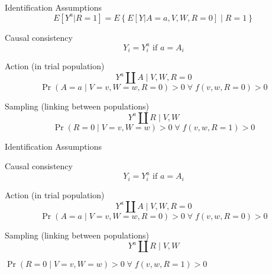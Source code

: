 \documentclass{beamer}
\begin{document}
\begin{frame}{Identification Assumptions}
	\[E[Y^a | R=1] = E\left\{E[Y|A=a,V,W,R=0] \mid R=1 \right\}\]
	\begin{block}{Causal consistency}
		\begin{equation*}
			Y_i = Y_i^a \text{ if } a=A_i
		\end{equation*}
	\end{block}
	\begin{block}{Action (in trial population)}
		\begin{equation*}
			Y^a \amalg A \mid V,W,R=0
		\end{equation*}
		\begin{equation*}
			\Pr(A = a \mid V=v,W=w,R=0) > 0 \; \forall \; f(v,w,R=0) > 0
		\end{equation*}
	\end{block}	
	\begin{block}{Sampling (linking between populations)}
		\begin{equation*}
			Y^a \amalg R \mid V,W
		\end{equation*}
		\begin{equation*}
			\Pr(R=0 \mid V=v, W=w) > 0 \; \forall \; f(v,w,R=1) > 0
		\end{equation*}
	\end{block}	
\end{frame}

\begin{frame}{Identification Assumptions}
	\begin{block}{Causal consistency}
		\begin{equation*}
			Y_i = Y_i^a \text{ if } a=A_i
		\end{equation*}
	\end{block}
	\begin{block}{Action (in trial population)}
		\begin{equation*}
			Y^a \amalg A \mid V,W,R=0
		\end{equation*}
		\begin{equation*}
			\Pr(A = a \mid V=v,W=w,R=0) > 0 \; \forall \; f(v,w,R=0) > 0
		\end{equation*}
	\end{block}	
	\begin{block}{Sampling (linking between populations)}
		\begin{equation*}
			Y^a \amalg R \mid V,W
		\end{equation*}
		\begin{center}
		\colorbox{yellow!25}{
			$\Pr(R=0 \mid V=v, W=w) > 0 \; \forall \; f(v,w,R=1) > 0$
		}
		\end{center}
	\end{block}	
\end{frame}
\end{document}
